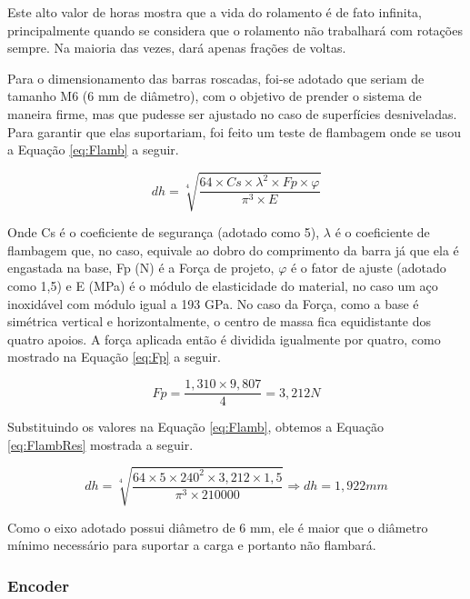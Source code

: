 \documentclass[
	12pt,				%
	openany,			%
	twoside,			%
	a4paper,			%
	english,			%
	french,				%
	spanish,			%
	brazil,				%
	oldfontcommands
	]{abntex2}
\begin{document}
Este alto valor de horas mostra que a vida do rolamento é de fato infinita, principalmente quando se considera que o rolamento não trabalhará com rotações sempre. Na maioria das vezes, dará apenas frações de voltas.

Para o dimensionamento das barras roscadas, foi-se adotado que seriam de tamanho M6 (6 mm de diâmetro), com o objetivo de prender o sistema de maneira firme, mas que pudesse ser ajustado no caso de superfícies desniveladas. Para garantir que elas suportariam, foi feito um teste de flambagem onde se usou a Equação \ref{eq:Flamb} a seguir.

\begin{equation}
dh = \sqrt[4]{ \frac{64 \times Cs \times \lambda^{2} \times Fp \times \varphi }{ \pi^{3} \times E } }
\label{eq:Flamb}
\end{equation}

Onde Cs é o coeficiente de segurança (adotado como 5), $\lambda$ é o coeficiente de flambagem que, no caso, equivale ao dobro do comprimento da barra já que ela é engastada na base, Fp (N) é a Força de projeto, $\varphi$ é o fator de ajuste (adotado como 1,5) e E (MPa) é o módulo de elasticidade do material, no caso um aço inoxidável com módulo igual a 193 GPa. No caso da Força, como a base é simétrica vertical e horizontalmente, o centro de massa fica equidistante dos quatro apoios. A força aplicada então é dividida igualmente por quatro, como mostrado na Equação \ref{eq:Fp} a seguir.

\begin{equation}
Fp = \frac{1,310 \times 9,807}{4} = 3,212 N
\label{eq:Fp}
\end{equation}

Substituindo os valores na Equação \ref{eq:Flamb}, obtemos a Equação \ref{eq:FlambRes} mostrada a seguir.

\begin{equation}
dh = \sqrt[4]{ \frac{64 \times 5 \times 240^{2} \times 3,212 \times 1,5 }{ \pi^{3} \times 210000 } } \Longrightarrow dh = 1,922 mm
\label{eq:FlambRes}
\end{equation}

Como o eixo adotado possui diâmetro de 6 mm, ele é maior que o diâmetro mínimo necessário para suportar a carga e portanto não flambará.

\subsubsection{Encoder}
\end{document}
